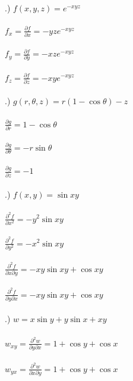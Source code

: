 \documentclass[12pt]{article}
\begin{document}
.) $f(x,y,z) = e^{-xyz}$\\\\
\noindent $f_{x} = \frac{\partial f}{\partial x} = -yze^{-xyz}$\\\\
\noindent $f_{y} = \frac{\partial f}{\partial y} = -xze^{-xyz}$\\\\
\noindent $f_{z} = \frac{\partial f}{\partial z} = -xye^{-xyz}$\\\\



.) $g(r, \theta, z) = r(1-\cos{\theta}) - z$\\\\
\noindent $\frac{\partial g}{\partial r} = 1-\cos{\theta}$\\\\
\noindent $\frac{\partial g}{\partial \theta} = -r\sin{\theta}$\\\\
\noindent $\frac{\partial g}{\partial z} = -1$\\\\


.) $f(x,y)=\sin{xy}$\\\\
\noindent $\frac{\partial ^{2}f}{\partial x^{2}} = -y^{2}\sin{xy}$\\\\
\noindent $\frac{\partial ^{2} f}{\partial y^{2}} = -x^{2}\sin{xy}$\\\\
\noindent $\frac{\partial ^{2} f}{\partial x \partial y} = -xy\sin{xy} + \cos{xy}$\\\\
\noindent $\frac{\partial ^{2} f}{\partial y \partial x} = -xy\sin{xy} + \cos{xy}$\\\\



.) $w = x\sin{y} + y\sin{x} + xy$\\\\
\noindent $w_{xy} = \frac{\partial ^{2}w}{\partial y \partial x} = 1 + \cos{y} + \cos{x}$\\\\
\noindent $w_{yx} = \frac{\partial ^{2}w}{\partial x \partial y} = 1 + \cos{y} + \cos{x}$\\\\
\end{document}
